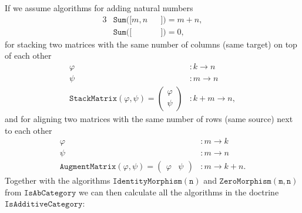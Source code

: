 \begin{computation} 
If we assume algorithms for adding natural numbers
\begin{alignat*}{3}
&\mathtt{Sum}( [ m, n &&] ) = m + n, \\
&\mathtt{Sum}( [  &&] ) = 0,
\end{alignat*}
for stacking two matrices with the same number of columns (same target) on top of each other
\begin{align*}
\varphi &: k \rightarrow n \\
\psi &: m \rightarrow n\\
\mathtt{StackMatrix}( \varphi, \psi ) =
\begin{pmatrix}
\varphi \\
\psi
\end{pmatrix} &: k + m \rightarrow n,
\end{align*}
and for aligning two matrices with the same number of rows (same source) next to each other
\begin{align*}
\varphi &: m \rightarrow k \\
\psi &: m \rightarrow n\\
\mathtt{AugmentMatrix}( \varphi, \psi ) =
\begin{pmatrix}
\varphi & \psi
\end{pmatrix} &: m \rightarrow k + n.
\end{align*}
Together with the algorithms $\mathtt{IdentityMorphism( n )}$ and $\mathtt{ZeroMorphism( m, n )}$ from $\mathtt{IsAbCategory}$
we can then calculate all the algorithms in the doctrine $\mathtt{IsAdditiveCategory}$:


\end{computation}

